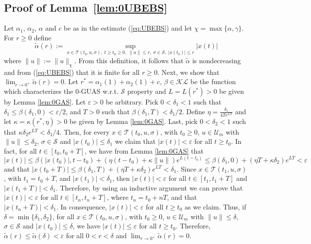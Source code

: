 \documentclass[9pt,final,journal]{IEEEtran}
\def\KL{\mathcal{KL}}
\def\S{\mathcal{S}}
\def\T{\mathcal{T}}
\def\U{\mathcal{U}}
\begin{document}
\subsection{Proof of Lemma~\ref{lem:0UBEBS}}
\label{sec:pf-lem-ubebsc0}

  Let $\alpha_1$, $\alpha_2$, $\alpha$ and $c$ be as in the estimate
  (\ref{eq:UBEBS}) and let $\chi=\max\{\alpha,\gamma\}$.  For
  $r\ge 0$ define
$$ \tilde \alpha(r):=\sup_{x\in \mathcal{T}(t_0,u,\sigma),\; t\ge t_0\ge 0,\; \|u\|\le r,\; \sigma\in \S, \;|x(t_0)|\le r} |x(t)| $$
where $\|u\|:=\|u\|_{\chi}$. From this definition, it follows that $\tilde\alpha$ is nondecreasing and from (\ref{eq:UBEBS}) that it is finite for all $r\ge 0$.
% 
Next, we show that $\lim_{r\to 0^+}\tilde \alpha(r)=0$. Let $r^*=\alpha_1(1)+\alpha_2(1)+c$, $\beta\in \KL$ be the function which characterizes the 0-GUAS w.r.t. $\S$ property and $L=L(r^*)>0$ be given by Lemma \ref{lem:0GAS}. 
%
Let $\varepsilon>0$ be arbitrary. Pick $0<\delta_1<1$ such that $\delta_1 \le \beta(\delta_1,0)<\varepsilon/2$, and $T>0$ such that $\beta(\delta_1,T)<\delta_1/2$. Define $\eta=\frac{\delta_1}{4 T e^{LT}}$ and let $\kappa=\kappa(r^*,\eta)>0$ be given by Lemma \ref{lem:0GAS}. Last, pick $0<\delta_2<1$ such that $\kappa \delta_2 e^{LT}<\delta_1/4$. Then, for every $x\in \T(t_0,u,\sigma)$, with $t_0\ge 0$, $u\in \U_m$
with $\|u\|\le \delta_2$, $\sigma\in \S$ and $|x(t_0)|\le \delta_1$ we
claim that $|x(t)|<\varepsilon$ for all $t\ge t_0$. In fact, for all
$t\in [t_0,t_0+T]$, we have from Lemma \ref{lem:0GAS} that
$|x(t)|\le \beta(|x(t_0)|,t-t_0)+ (\eta(t-t_0)+\kappa \|u\|)e^{L(t-t_0)}\le
\beta(\delta_1,0)+(\eta T+\kappa \delta_2) e^{LT}<\varepsilon$
and that
$|x(t_0+T)|\le \beta(\delta_1,T)+(\eta T+ \kappa \delta_2)
e^{LT}<\delta_1$.
Since $x\in \T(t_1,u,\sigma)$, with $t_1=t_0+T$, and
$|x(t_1)|< \delta_1$, then $|x(t)|<\varepsilon$ for all
$t\in [t_1,t_1+T]$ and $|x(t_1+T)|<\delta_1$. Therefore, by using an
inductive argument we can prove that $|x(t)|<\varepsilon$ for all
$t\in [t_n,t_{n}+T]$, where $t_n=t_0+nT$, and that
$|x(t_n+T)|<\delta_1$. In consequence, $|x(t)|<\varepsilon$ for all
$t\ge t_0$ as we claim.
% 
Thus, if $\delta=\min\{\delta_1,\delta_2\}$, for all
$x\in \T(t_0,u,\sigma)$, with $t_0\ge 0$, $u\in \U_m$ with
$\|u\|\le \delta$, $\sigma\in \S$ and $|x(t_0)|\le \delta$, we have
$|x(t)|\le \varepsilon$ for all $t\ge t_0$. Therefore,
$\tilde \alpha(r)\le \tilde \alpha(\delta)<\varepsilon$ for all
$0<r<\delta$ and $\lim_{r\to 0^+}\tilde \alpha(r)=0$.
 
\end{document}
